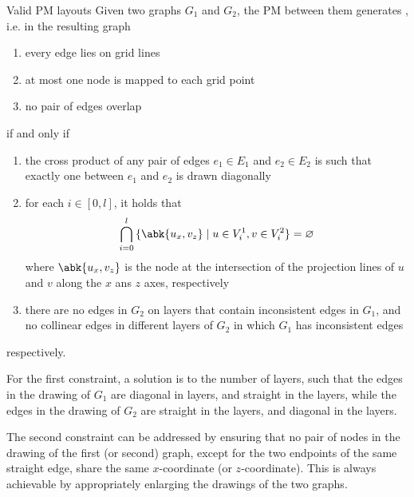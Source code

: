 \documentclass[a4paper, 12pt]{report}
\begin{document}
    \begin{framedprop}{Valid PM layouts}
        Given two graphs $G_1$ and $G_2$, the PM between them generates , i.e. in the resulting graph

        \begin{enumerate}
            \item every edge lies on grid lines
            \item at most one node is mapped to each grid point
            \item no pair of edges overlap
        \end{enumerate}
        
        if and only if

        \begin{enumerate}
            \item the cross product of any pair of edges $e_1 \in E_1$ and $e_2 \in E_2$ is such that exactly one between $e_1$ and $e_2$ is drawn diagonally
            \item for each $i \in [0, l]$, it holds that $$\bigcap_{i = 0}^l{\{\abk{u_x,v_z} \mid u \in V_i^1, v \in V_i^2 \}} = \varnothing$$ where $\abk{u_x, v_z}$ is the node at the intersection of the projection lines of $u$ and $v$ along the $x$ ans $z$ axes, respectively
            \item there are no edges in $G_2$ on layers that contain inconsistent edges in $G_1$, and no collinear edges in different layers of $G_2$ in which $G_1$ has inconsistent edges
        \end{enumerate}

        respectively.

    \end{framedprop}

    For the first constraint, a solution is to  the number of layers, such that the edges in the drawing of $G_1$ are diagonal in  layers, and straight in the  layers, while the edges in the drawing of $G_2$ are straight in the  layers, and diagonal in the  layers.


    The second constraint can be addressed by ensuring that no pair of nodes in the drawing of the first (or second) graph, except for the two endpoints of the same straight edge, share the same $x$-coordinate (or $z$-coordinate). This is always achievable by appropriately enlarging the drawings of the two graphs.
    
\end{document}
